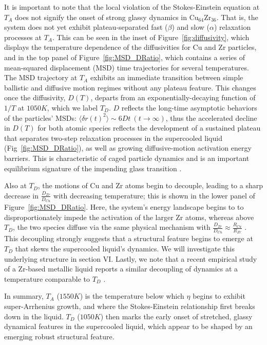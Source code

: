 \documentclass[aps,prl,preprint,showpacs,amsmath,floatfix,superscriptaddress]{revtex4}
\begin{document}
It is important to note that the local violation of the
Stokes-Einstein equation at $T_{A}$ does not signify the onset of
strong glassy dynamics in $\mathrm{Cu_{64}Zr_{36}}$. That is, the
system does not yet exhibit plateau-separated fast ($\beta$) and
slow ($\alpha$) relaxation processes at $T_{A}$. This can be seen
in the inset of Figure~\ref{fig:diffusivity}, which displays the
temperature dependence of the diffusivities for Cu and Zr
particles, and in the top panel of Figure~\ref{fig:MSD_DRatio},
which contains a series of mean-squared displacement (MSD) time
trajectories for several temperatures. The MSD trajectory at
$T_{A}$ exhibits an immediate transition between simple ballistic
and diffusive motion regimes without any plateau feature. This
changes once the diffusivity, $D(T)$, departs from an
exponentially-decaying function of $1/T$ at $1050 K$, which we
label $T_{D}$. $D$ reflects the long-time asymptotic behaviors of
the particles' MSDs: $\langle\delta r(t)^{2}\rangle \sim 6Dt\ (t
\rightarrow \infty)$, thus the accelerated decline in $D(T)$ for
both atomic species reflects the development of a sustained
plateau that separates two-step relaxation processes in the
supercooled liquid (Fig~\ref{fig:MSD_DRatio}), as well as growing
diffusive-motion activation energy barriers. This is
characteristic of caged particle dynamics and is an important
equilibrium signature of the impending glass transition
\cite{2009Gotze, 2009Cavagna}.


Also at $T_{D}$, the motions of Cu and Zr atoms begin to decouple,
leading to a sharp decrease in $\frac{D_{Zr}}{D_{Cu}}$ with
decreasing temperature; this is shown in the lower panel of
Figure~\ref{fig:MSD_DRatio}. Here, the system's energy landscape
begins to to disproportionately impede the activation of the
larger Zr atoms, whereas above $T_{D}$, the two species diffuse
via the same physical mechanism with $\frac{D_{Zr}}{D_{Cu}}
\approx \frac{R_{Cu}}{R_{Zr}}$ \cite{radius}. This decoupling
strongly suggests that a structural feature begins to emerge at
$T_{D}$ that skews the supercooled liquid's dynamics. We will
investigate this underlying structure in section VI. Lastly, we
note that a recent empirical study of a Zr-based metallic liquid
reports a similar decoupling of dynamics at a temperature
comparable to $T_{D}$ \cite{Basuki2014}.

In summary, $T_{A}$ ($1550K$) is the temperature below which
$\eta$ begins to exhibit super-Arrhenius growth, and where the
Stokes-Einstein relationship first breaks down in the liquid.
$T_{D}$ ($1050K$) then marks the early onset of stretched, glassy
dynamical features in the supercooled liquid, which appear to be
shaped by an emerging robust structural feature.
\end{document}
